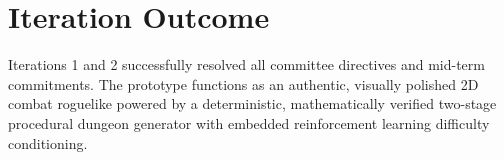 \section{Iteration Outcome}
Iterations 1 and 2 successfully resolved all committee directives and mid-term commitments. The prototype functions as an authentic, visually polished 2D combat roguelike powered by a deterministic, mathematically verified two-stage procedural dungeon generator with embedded reinforcement learning difficulty conditioning.
